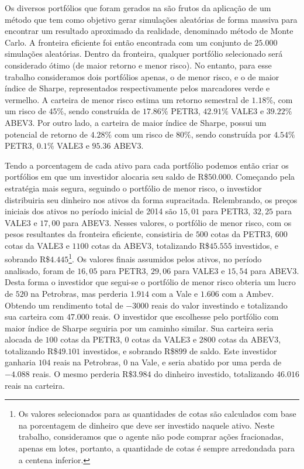 Os diversos portfólios que foram gerados na  são frutos da aplicação de um método que tem como objetivo gerar simulações aleatórias de forma massiva para encontrar um resultado aproximado da realidade, denominado método de Monte Carlo. A fronteira eficiente foi então encontrada com um conjunto de $25.000$ simulações aleatórias. Dentro da fronteira, qualquer portfólio selecionado será considerado ótimo (de maior retorno e menor risco). No entanto, para esse trabalho consideramos dois portfólios apenas, o de menor risco, e o de maior índice de Sharpe, representados respectivamente pelos marcadores verde e vermelho. A carteira de menor risco estima um retorno semestral de $1.18\%$, com um risco de $45\%$, sendo construída de $17.86\%$ PETR3, $42.91\%$ VALE3 e $39.22\%$ ABEV3. Por outro lado, a carteira de maior índice de Sharpe, possui um potencial de retorno de $4.28\%$ com um risco de $80\%$, sendo construída por $4.54\%$ PETR3, $0.1\%$ VALE3 e $95.36$ ABEV3.

Tendo a porcentagem de cada ativo para cada portfólio podemos então criar os portfólios em que um investidor alocaria seu saldo de R\$$50.000$. Começando pela estratégia mais segura, seguindo o portfólio de menor risco, o investidor distribuiria seu dinheiro nos ativos da forma supracitada. Relembrando, os preços iniciais dos ativos no período inicial de 2014 são $15,01$ para PETR3, $32,25$ para VALE3 e $17,00$ para ABEV3. Nesses valores, o portfólio de menor risco, com os pesos resultantes da fronteira eficiente, consistiria de $500$ cotas da PETR3, $600$ cotas da VALE3 e $1100$ cotas da ABEV3, totalizando R\$$45.555$ investidos, e sobrando R\$$4.445$\footnote{Os valores selecionados para as quantidades de cotas são calculados com base na porcentagem de dinheiro que deve ser investido naquele ativo. Neste trabalho, consideramos que o agente não pode comprar ações fracionadas, apenas em lotes, portanto, a quantidade de cotas é sempre arredondada para a centena inferior.}. Os valores finais assumidos pelos ativos, no período analisado, foram de $16,05$ para PETR3, $29,06$ para VALE3 e $15,54$ para ABEV3. Desta forma o investidor que segui-se o portfólio de menor risco obteria um lucro de $520$ na Petrobras, mas perderia $1.914$ com a Vale e $1.606$ com a Ambev. Obtendo um rendimento total de $-3000$ reais do valor investindo e totalizando sua carteira com $47.000$ reais. O investidor que escolhesse pelo portfólio com maior índice de Sharpe seguiria por um caminho similar. Sua carteira seria alocada de $100$ cotas da PETR3, $0$ cotas da VALE3 e $2800$ cotas da ABEV3, totalizando R\$$49.101$ investidos, e sobrando R\$$899$ de saldo. Este investidor ganharia $104$ reais na Petrobras, $0$ na Vale, e seria abatido por uma perda de $-4.088$ reais. O mesmo perderia R\$$3.984$ do dinheiro investido, totalizando $46.016$ reais na carteira.


